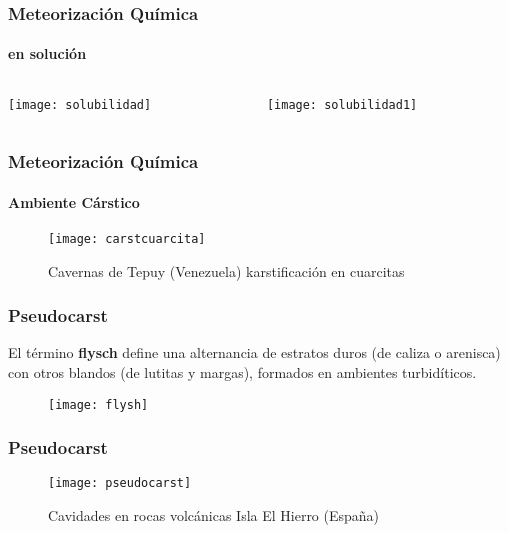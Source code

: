 \documentclass{beamer}
\begin{document}
\begin{frame}
\frametitle{Meteorización Química}
\framesubtitle{en solución}
\begin{columns}
\begin{column}{.5\linewidth}
\begin{center}
\texttt{[image: solubilidad]}
\end{center}
\end{column}
\begin{column}{.5\linewidth}
\begin{center}
\texttt{[image: solubilidad1]}
\end{center}
\end{column}
\end{columns}
\end{frame}
\begin{frame}
\frametitle{Meteorización Química}
\framesubtitle{Ambiente Cárstico}
\begin{figure}
\begin{center}
   	\texttt{[image: carstcuarcita]}
\end{center}
\caption{Cavernas de Tepuy (Venezuela) karstificación en cuarcitas}
\end{figure}
\end{frame}
\begin{frame}
\frametitle{Pseudocarst}
\small{El término \textbf{flysch} define una alternancia de estratos duros (de caliza o arenisca) con otros blandos (de lutitas y margas), formados en ambientes turbidíticos.}
\begin{figure}
\begin{center}
   	\texttt{[image: flysh]}
\end{center}
\end{figure}
\end{frame}
\begin{frame}
\frametitle{Pseudocarst}
\begin{figure}
\begin{center}
   	\texttt{[image: pseudocarst]}
\end{center}
\caption{Cavidades en rocas volcánicas Isla El Hierro (España)}
\end{figure}
\end{frame}
\end{document}
